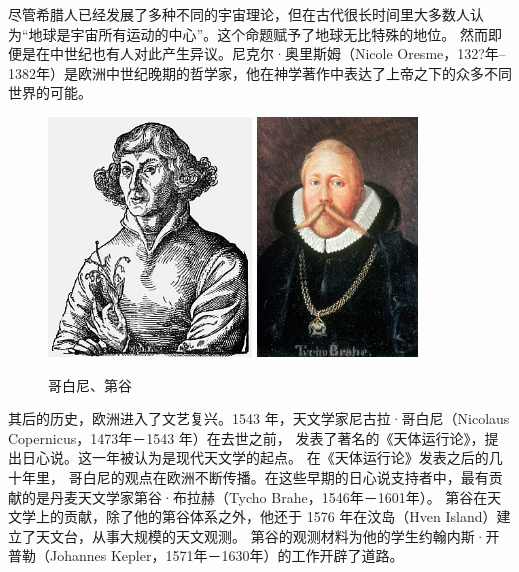 \documentclass[a4paper,10.5pt]{book}
\begin{document}
尽管希腊人已经发展了多种不同的宇宙理论，但在古代很长时间里大多数人认为“地球是宇宙所有运动的中心”。这个命题赋予了地球无比特殊的地位。
然而即便是在中世纪也有人对此产生异议。尼克尔·奥里斯姆（Nicole Oresme，132?年–1382年）是欧洲中世纪晚期的哲学家，他在神学著作中表达了上帝之下的众多不同世界的可能。

\begin{figure}[ht]
\centering
\includegraphics[height=2.5in]{images/1_05-Mikolaj_Kopernik.jpg}
\includegraphics[height=2.5in]{images/1_08-Tycho_Brahe.jpg}
\caption{哥白尼、第谷}
\end{figure}

其后的历史，欧洲进入了文艺复兴。1543 年，天文学家尼古拉·哥白尼（Nicolaus Copernicus，1473年－1543 年）在去世之前，
发表了著名的《天体运行论》，提出日心说。这一年被认为是现代天文学的起点。 在《天体运行论》发表之后的几十年里，
哥白尼的观点在欧洲不断传播。在这些早期的日心说支持者中，最有贡献的是丹麦天文学家第谷·布拉赫（Tycho Brahe，1546年－1601年）。
第谷在天文学上的贡献，除了他的第谷体系之外，他还于 1576 年在汶岛（Hven Island）建立了天文台，从事大规模的天文观测。
第谷的观测材料为他的学生约翰内斯·开普勒（Johannes Kepler，1571年－1630年）的工作开辟了道路。
\end{document}

